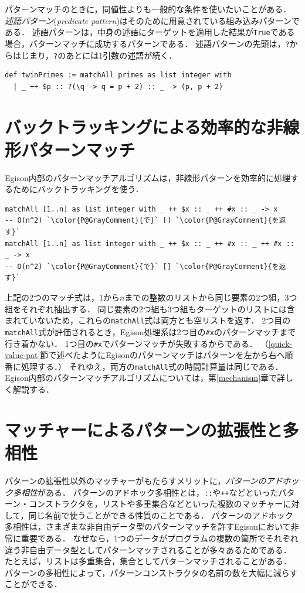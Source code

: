 パターンマッチのときに，同値性よりも一般的な条件を使いたいことがある．
\emph{述語パターン}(\emph{predicate pattern})はそのために用意されている組み込みパターンである．
述語パターンは，中身の述語にターゲットを適用した結果が\lstinline{True}である場合，パターンマッチに成功するパターンである．
述語パターンの先頭は，\lstinline{?}からはじまり，\lstinline{?}のあとには1引数の述語が続く．
\begin{lstlisting}[language=egison,numbers=none]
def twinPrimes := matchAll primes as list integer with
  | _ ++ $p :: ?(\q -> q = p + 2) :: _ -> (p, p + 2)
\end{lstlisting}

\section{バックトラッキングによる効率的な非線形パターンマッチ}\label{quick-backtrack}

Egison内部のパターンマッチアルゴリズムは，非線形パターンを効率的に処理するためにバックトラッキングを使う．
\begin{lstlisting}[language=egison,numbers=none]
matchAll [1..n] as list integer with _ ++ $x :: _ ++ #x :: _ -> x
-- O(n^2) `\color{P@GrayComment}{で}` [] `\color{P@GrayComment}{を返す}`
matchAll [1..n] as list integer with _ ++ $x :: _ ++ #x :: _ ++ #x :: _ -> x
-- O(n^2) `\color{P@GrayComment}{で}` [] `\color{P@GrayComment}{を返す}`
\end{lstlisting}
上記の2つのマッチ式は，$1$から$n$までの整数のリストから同じ要素の2つ組，3つ組をそれぞれ抽出する．
同じ要素の2つ組も3つ組もターゲットのリストには含まれていないため，これらの\lstinline{matchAll}式は両方とも空リストを返す．
2つ目の\lstinline{matchAll}式が評価されるとき，Egison処理系は2つ目の\lstinline|#x|のパターンマッチまで行き着かない．
1つ目の\lstinline|#x|でパターンマッチが失敗するからである．
（\ref{quick-value-pat}節で述べたようにEgisonのパターンマッチはパターンを左から右へ順番に処理する．）
それゆえ，両方の\lstinline{matchAll}式の時間計算量は同じである．
Egison内部のパターンマッチアルゴリズムについては，第\ref{mechanism}章で詳しく解説する．

\section{マッチャーによるパターンの拡張性と多相性}\label{quick-matcher}

パターンの拡張性以外のマッチャーがもたらすメリットに，\emph{パターンのアドホック多相性}がある．
パターンのアドホック多相性とは，\lstinline{::}や\lstinline{++}などといったパターン・コンストラクタを，リストや多重集合などといった複数のマッチャーに対して，同じ名前で使うことができる性質のことである．
パターンのアドホック多相性は，さまざまな非自由データ型のパターンマッチを許すEgisonにおいて非常に重要である．
なぜなら，1つのデータがプログラムの複数の箇所でそれぞれ違う非自由データ型としてパターンマッチされることが多々あるためである．
たとえば，リストは多重集合，集合としてパターンマッチされることがある．
パターンの多相性によって，パターンコンストラクタの名前の数を大幅に減らすことができる．

